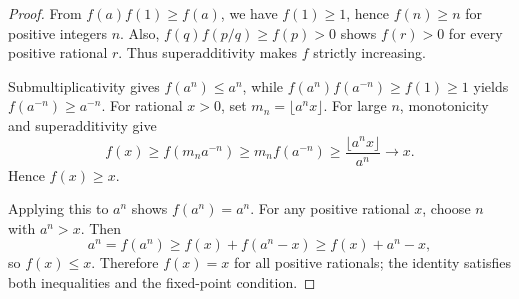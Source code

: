
\begin{dlsummary}[title={\bfseries Solution 2. IMO 2013 -- Problem 5},breakable]

\begin{proof}
From $f(a)f(1)\geq f(a)$, we have $f(1)\geq1$, hence
$f(n)\geq n$ for positive integers $n$. Also,
$f(q)f(p/q)\geq f(p)>0$ shows $f(r)>0$ for every positive rational
$r$. Thus superadditivity makes $f$ strictly increasing.

Submultiplicativity gives $f(a^n)\leq a^n$, while
$f(a^n)f(a^{-n})\geq f(1)\geq1$ yields $f(a^{-n})\geq a^{-n}$.
For rational $x>0$, set $m_n=\lfloor a^n x\rfloor$. For large $n$,
monotonicity and superadditivity give
\[
f(x)\geq f(m_na^{-n})\geq m_nf(a^{-n})
\geq\frac{\lfloor a^n x\rfloor}{a^n}\longrightarrow x.
\]
Hence $f(x)\geq x$.

Applying this to $a^n$ shows $f(a^n)=a^n$. For any positive
rational $x$, choose $n$ with $a^n>x$. Then
\[
a^n=f(a^n)\geq f(x)+f(a^n-x)\geq f(x)+a^n-x,
\]
so $f(x)\leq x$. Therefore $f(x)=x$ for all positive rationals;
the identity satisfies both inequalities and the fixed-point condition.
\end{proof}

\end{dlsummary}